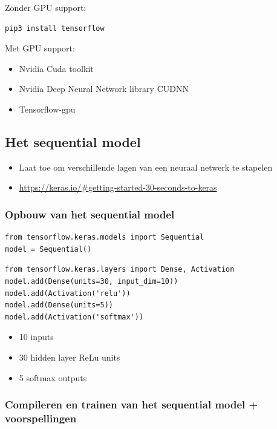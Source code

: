 \documentclass{article}
\begin{document}
Zonder GPU support:

\begin{verbatim}
pip3 install tensorflow
\end{verbatim}

Met GPU support:

\begin{itemize}
    \item Nvidia Cuda toolkit
    \item Nvidia Deep Neural Network library CUDNN
    \item Tensorflow-gpu
\end{itemize}

\subsection{Het sequential model}

\begin{itemize}
    \item Laat toe om verschillende lagen van een neuraal netwerk te stapelen
    \item \url{https://keras.io/#getting-started-30-seconds-to-keras}
\end{itemize}

\subsubsection{Opbouw van het sequential model}


\begin{verbatim}
from tensorflow.keras.models import Sequential
model = Sequential()
\end{verbatim}

\begin{verbatim}
from tensorflow.keras.layers import Dense, Activation
model.add(Dense(units=30, input_dim=10))
model.add(Activation('relu'))
model.add(Dense(units=5))
model.add(Activation('softmax'))
\end{verbatim}

\begin{itemize}
    \item 10 inputs
    \item 30 hidden layer ReLu units
    \item 5 softmax outputs
\end{itemize}

\subsubsection{Compileren en trainen van het sequential model + voorspellingen}
\end{document}
